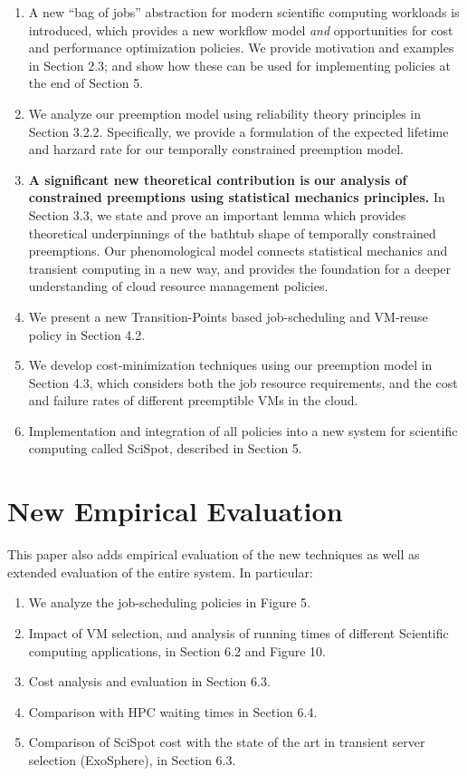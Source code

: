 \documentclass{article}
\begin{document}
\begin{enumerate}

\item A new ``bag of jobs'' abstraction for modern scientific computing workloads is introduced, which provides a new workflow model \emph{and} opportunities for cost and performance optimization policies. We provide motivation and examples in Section 2.3; and show how these can be used for implementing policies at the end of Section 5. 
  
\item We analyze our preemption model using reliability theory principles in Section 3.2.2. Specifically, we provide a formulation of the expected lifetime and harzard rate for our temporally constrained preemption model.

  
\item \textbf{A significant new theoretical contribution is our analysis of constrained preemptions using statistical mechanics principles.} In Section 3.3, we state and prove an important lemma which provides theoretical underpinnings of the bathtub shape of temporally constrained preemptions. Our phenomological model connects statistical mechanics and transient computing in a new way, and provides the foundation for a deeper understanding of cloud resource management policies. 

\item We present a new Transition-Points based job-scheduling and VM-reuse policy in Section 4.2. 

\item We develop cost-minimization techniques using our preemption model in Section 4.3, which considers both the job resource requirements, and the cost and failure rates of different preemptible VMs in the cloud. 

\item Implementation and integration of all policies into a new system for scientific computing called SciSpot, described in Section 5. 

\end{enumerate}

\section{New Empirical Evaluation}

This paper also adds empirical evaluation of the new techniques as well as extended evaluation of the entire system. In particular:

\begin{enumerate}
\item We analyze the job-scheduling policies in Figure 5. 
\item Impact of VM selection, and analysis of running times of different Scientific computing applications, in Section 6.2 and Figure 10.
\item Cost analysis and evaluation in Section 6.3. 
\item Comparison with HPC waiting times in Section 6.4. 
\item Comparison of SciSpot cost with the state of the art in transient server selection (ExoSphere), in Section 6.3. 
\end{enumerate}
\end{document}
